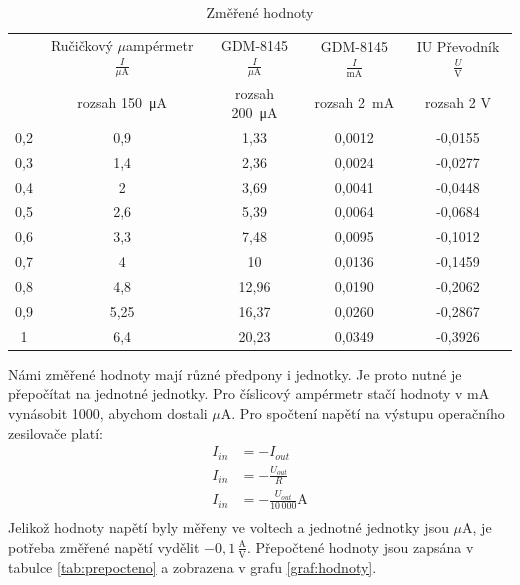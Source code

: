 \documentclass[a4paper,12pt]{article}   %
\newcommand{\tmu}{$\mu$}
\begin{document}
\begin{table}[h!]
    \begin{tabular}{|c|c|c|c|c|}
        \hline
        \rule{0pt}{2.5ex}
        \multirow{2}{*}{Vstupní napětí $\frac{U}{\textrm{V}}$}& Ručičkový \tmu ampérmetr$\frac{I}{\mu\textrm{A}}$ 	&GDM-8145 $\frac{I}{\mu\textrm{A}}$	&GDM-8145 $\frac{I}{\textrm{mA}}$	&IU Převodník $\frac{U}{\textrm{V}}$  \\[.7ex]
        & rozsah  150~μA & rozsah 200~μA & rozsah  2~mA & rozsah  2 V\\\hline\hline
        0,2&0,9&1,33&0,0012&-0,0155\\\hline
        0,3&1,4&2,36&0,0024&-0,0277\\\hline
        0,4&2&3,69&0,0041&-0,0448\\\hline
        0,5&2,6&5,39&0,0064&-0,0684\\\hline
        0,6&3,3&7,48&0,0095&-0,1012\\\hline
        0,7&4&10&0,0136&-0,1459\\\hline
        0,8&4,8&12,96&0,0190&-0,2062\\\hline
        0,9&5,25&16,37&0,0260&-0,2867\\\hline
        1&6,4&20,23&0,0349&-0,3926\\\hline
    
    \end{tabular}
    \caption{Změřené hodnoty}
    \label{tab:zmereno}
\end{table}

Námi změřené hodnoty mají různé předpony i jednotky. Je proto nutné je přepočítat na jednotné jednotky. Pro číslicový ampérmetr stačí hodnoty v mA vynásobit 1000, abychom dostali \tmu A. Pro spočtení napětí na výstupu operačního zesilovače platí:
\begin{equation*}
    \begin{split}
        I_{in}&=-I_{out}\\
        I_{in}&=-\frac{U_{out}}{R}\\
        I_{in}&=-\frac{U_{out}}{10\,000} \textrm{A}\\
    \end{split}
\end{equation*}
Jelikož hodnoty napětí byly měřeny ve voltech a jednotné jednotky jsou \tmu A, je potřeba změřené napětí vydělit $-0,1\,\frac{\textrm{A}}{\textrm{V}}$. Přepočtené hodnoty jsou zapsána v tabulce \ref{tab:prepocteno} a zobrazena v grafu \ref{graf:hodnoty}.
\end{document}
